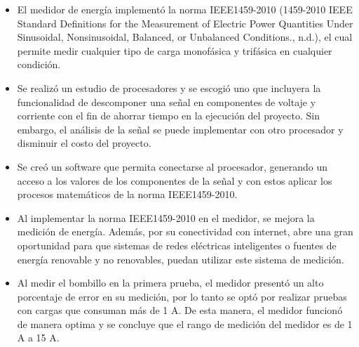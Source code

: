 \begin{itemize}
    \item El medidor de energía implementó la norma IEEE1459-2010 (1459-2010 IEEE Standard Definitions for the Measurement of Electric Power Quantities Under Sinusoidal, Nonsinusoidal, Balanced, or Unbalanced Conditions., n.d.), el cual permite medir cualquier tipo de carga monofásica y trifásica en cualquier condición.
    \item Se realizó un estudio de procesadores y se escogió uno que incluyera la funcionalidad de descomponer una señal en componentes de voltaje y corriente con el fin de ahorrar tiempo en la ejecución del proyecto. Sin embargo, el análisis de la señal se puede implementar con otro procesador y disminuir el costo del proyecto.
    \item Se creó un software que permita conectarse al procesador, generando un acceso a los valores de los componentes de la señal y con estos aplicar los procesos matemáticos de la norma IEEE1459-2010.
    \item Al implementar la norma IEEE1459-2010 en el medidor, se mejora la medición de energía. Además, por su conectividad con internet, abre una gran oportunidad para que sistemas de redes eléctricas inteligentes o fuentes de energía renovable y no renovables, puedan utilizar este sistema de medición.
    \item Al medir el bombillo en la primera prueba, el medidor presentó un alto porcentaje de error en su medición, por lo tanto se optó por realizar pruebas con cargas que consuman más de 1 A. De esta manera, el medidor funcionó de manera optima y se concluye que el rango de medición del medidor es de 1 A a 15 A.

\end{itemize}
